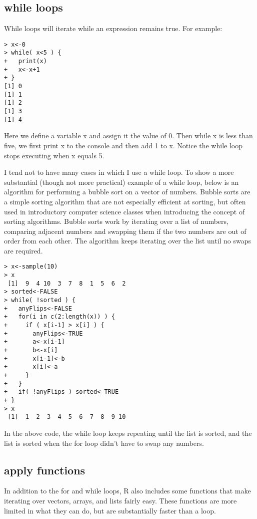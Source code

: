 \documentclass[12pt, oneside]{amsart}   	%
\begin{document}
\subsection{while loops}

While loops will iterate while an expression remains true. For example:

\begin{verbatim}
> x<-0
> while( x<5 ) {
+   print(x)
+   x<-x+1
+ }
[1] 0
[1] 1
[1] 2
[1] 3
[1] 4
\end{verbatim}

Here we define a variable x and assign it the value of 0. Then while x is less than five, we first print x to the console and then add 1 to x. Notice the while loop stops executing when x equals 5. 

I tend not to have many cases in which I use a while loop. To show a more substantial (though not more practical) example of a while loop, below is an algorithm for performing a bubble sort on a vector of numbers. Bubble sorts are a simple sorting algorithm that are not especially efficient at sorting, but often used in introductory computer science classes when introducing the concept of sorting algorithms. Bubble sorts work by iterating over a list of numbers, comparing adjacent numbers and swapping them if the two numbers are out of order from each other. The algorithm keeps iterating over the list until no swaps are required. 

\begin{verbatim}
> x<-sample(10)
> x
 [1]  9  4 10  3  7  8  1  5  6  2
> sorted<-FALSE
> while( !sorted ) {
+   anyFlips<-FALSE
+   for(i in c(2:length(x)) ) {
+     if ( x[i-1] > x[i] ) {
+       anyFlips<-TRUE
+       a<-x[i-1]
+       b<-x[i]
+       x[i-1]<-b
+       x[i]<-a
+     }
+   }
+   if( !anyFlips ) sorted<-TRUE
+ }
> x
 [1]  1  2  3  4  5  6  7  8  9 10
\end{verbatim}

In the above code, the while loop keeps repeating until the list is sorted, and the list is sorted when the for loop didn't have to swap any numbers. 

\subsection{apply functions}

In addition to the for and while loops, R also includes some functions that make iterating over vectors, arrays, and lists fairly easy. These functions are more limited in what they can do, but are substantially faster than a loop. 
\end{document}
